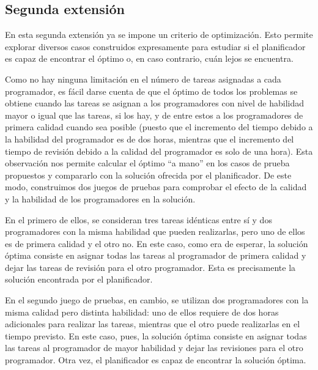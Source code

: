 
\subsection{Segunda extensión} \label{sec:res-ext2}

En esta segunda extensión ya se impone un criterio de optimización. Esto 
permite explorar diversos casos construidos expresamente para estudiar si 
el planificador es capaz de encontrar el óptimo o, en caso contrario, cuán 
lejos se encuentra. 

Como no hay ninguna limitación en el número de tareas asignadas a cada 
programador, es fácil darse cuenta de que el óptimo de todos los problemas se 
obtiene cuando las tareas se asignan a los programadores con nivel de 
habilidad mayor o igual que las tareas, si los hay, y de entre estos a los 
programadores de primera calidad cuando sea posible (puesto que el incremento 
del tiempo debido a la habilidad del programador es de dos horas, mientras 
que el incremento del tiempo de revisión debido a la calidad del programador 
es solo de una hora). Esta observación nos permite calcular el óptimo 
``a mano'' en los casos de prueba propuestos y compararlo con la solución 
ofrecida por el planificador. De este modo, construimos dos juegos de 
pruebas para comprobar el efecto de la calidad y la habilidad de los 
programadores en la solución.

En el primero de ellos, se consideran tres tareas idénticas entre sí y dos 
programadores con la misma habilidad que pueden realizarlas, pero uno de 
ellos es de primera calidad y el otro no. En este caso, como era de esperar, 
la solución óptima consiste en asignar todas las tareas al programador de 
primera calidad y dejar las tareas de revisión para el otro programador. Esta 
es precisamente la solución encontrada por el planificador.

En el segundo juego de pruebas, en cambio, se utilizan dos programadores con 
la misma calidad pero distinta habilidad: uno de ellos requiere de dos horas 
adicionales para realizar las tareas, mientras que el otro puede realizarlas 
en el tiempo previsto. En este caso, pues, la solución óptima consiste en 
asignar todas las tareas al programador de mayor habilidad y dejar las 
revisiones para el otro programador. Otra vez, el planificador es capaz de 
encontrar la solución óptima.



